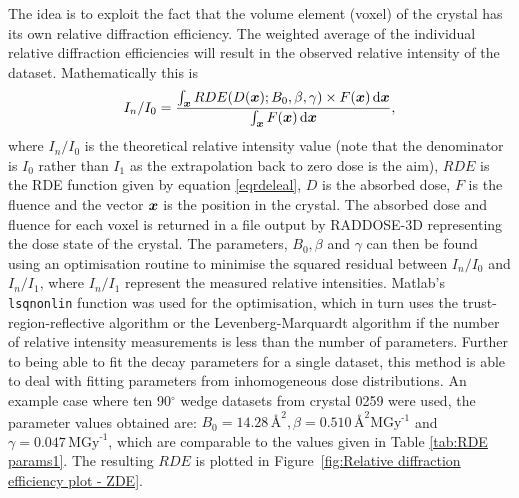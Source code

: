The idea is to exploit the fact that the volume element (voxel) of the crystal has its own relative diffraction efficiency.
The weighted average of the individual relative diffraction efficiencies will result in the observed relative intensity of the dataset.
Mathematically this is
\begin{equation}
    I_n/I_0 = \frac{\int_{\boldsymbol{x}} RDE(D(\boldsymbol{x}); B_0, \beta, \gamma) \times F(\boldsymbol{x})\,\mathrm{d}\boldsymbol{x}}{\int_{\boldsymbol{x}} F(\boldsymbol{x})\,\mathrm{d}\boldsymbol{x}},
\end{equation}
where $I_n/I_0$ is the theoretical relative intensity value (note that the denominator is $I_0$ rather than $I_1$ as the extrapolation back to zero dose is the aim), $RDE$ is the RDE function given by equation \ref{eqrdeleal}, $D$ is the absorbed dose, $F$ is the fluence and the vector $\boldsymbol{x}$ is the position in the crystal.
The absorbed dose and fluence for each voxel is returned in a file output by RADDOSE-3D representing the dose state of the crystal.
The parameters, $B_0, \beta$ and $\gamma$ can then be found using an optimisation routine to minimise the squared residual between $I_n/I_0$ and $I_n/I_1$, where $I_n/I_1$ represent the measured relative intensities.
Matlab's \verb+lsqnonlin+ function was used for the optimisation, which in turn uses the trust-region-reflective algorithm \cite{coleman1996} or the Levenberg-Marquardt algorithm \cite{more1978levenberg} if the number of relative intensity measurements is less than the number of parameters.
Further to being able to fit the decay parameters for a single dataset, this method is able to deal with fitting parameters from inhomogeneous dose distributions.
An example case where ten 90$^{\circ}$ wedge datasets from crystal 0259 were used, the parameter values obtained are: $B_0 = 14.28\,\text{\AA}^2, \beta = 0.510\,\text{\AA}^2 \text{MGy}^{\text{-1}}$ and $\gamma = 0.047\,\text{MGy}^{\text{-1}}$, which are comparable to the values given in Table \ref{tab:RDE params1}.
The resulting $RDE$ is plotted in Figure~\ref{fig:Relative diffraction efficiency plot - ZDE}.
